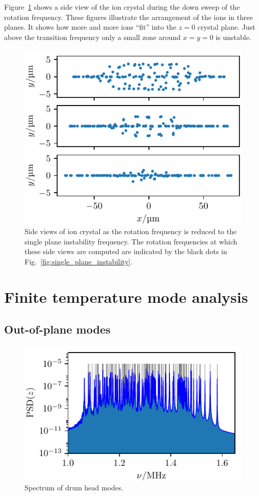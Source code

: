 \documentclass[aps, pra, preprint]{revtex4-1}
\begin{document}
Figure~\ref{fig:side_views_single_plane_instability} shows a side
view of the ion crystal during the down sweep of the rotation
frequency. These figures illustrate the arrangement of the ions
in three planes. It shows how more and more ions ``fit'' into the
$z=0$ crystal plane. Just above the transition frequency only a
small zone around $x=y=0$ is unstable.
\begin{figure}
  \includegraphics{./figures/fig_side_views_single_plane_instability.pdf}
  \caption{Side views of ion crystal as the rotation frequency is
    reduced to the single plane instability frequency. The
    rotation frequencies at which these side views are computed
    are indicated by the black dots in
    Fig.~\ref{fig:single_plane_instability}.}
  \label{fig:side_views_single_plane_instability}
\end{figure}


\section{Finite temperature mode analysis}

\subsection{Out-of-plane modes}

\begin{figure}
  \includegraphics{./figures/fig_axial_spectrum.pdf}
  \caption{Spectrum of drum head modes.}
  \label{fig:axial_spectrum}
\end{figure}
\end{document}
